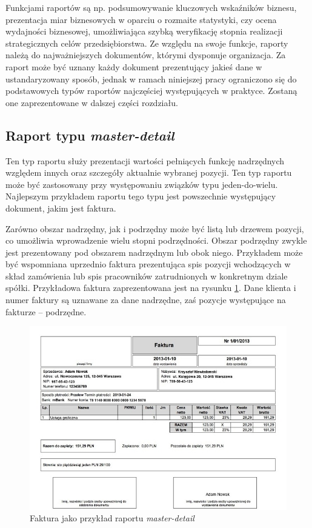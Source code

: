 \documentclass[11pt,a4paper]{article}
\begin{document}
Funkcjami raportów są np. podsumowywanie kluczowych wskaźników biznesu, prezentacja miar biznesowych w oparciu o rozmaite statystyki, czy ocena wydajności biznesowej, umożliwiająca szybką weryfikację stopnia realizacji strategicznych celów przedsiębiorstwa. Ze względu na swoje funkcje, raporty należą do najważniejszych dokumentów, którymi dysponuje organizacja. 
Za raport może być uznany każdy dokument prezentujący jakieś dane w ustandaryzowany sposób, jednak w ramach niniejszej pracy ograniczono się do podstawowych typów raportów najczęściej występujących w praktyce. Zostaną one zaprezentowane w dalszej części rozdziału.

\subsection{Raport typu \emph{master-detail}} \label{teoria:md}
Ten typ raportu służy prezentacji wartości pełniących funkcję nadrzędnych względem innych oraz szczegóły aktualnie wybranej pozycji. Ten typ raportu może być zastosowany przy występowaniu związków typu jeden-do-wielu. Najlepszym przykładem raportu tego typu jest powszechnie występujący dokument, jakim jest faktura. 

Zarówno obszar nadrzędny, jak i podrzędny może być listą lub drzewem pozycji, co umożliwia wprowadzenie wielu stopni podrzędności. Obszar podrzędny zwykle jest prezentowany pod obszarem nadrzędnym lub obok niego. Przykładem może być wspomniana uprzednio faktura prezentująca spis pozycji wchodzących w skład zamówienia lub spis pracowników zatrudnionych w konkretnym dziale spółki. Przykładowa faktura zaprezentowana jest na rysunku \ref{img:faktura}. Dane klienta i numer faktury są uznawane za dane nadrzędne, zaś pozycje występujące na fakturze -- podrzędne. 

\begin{figure}[h]
\centering
\includegraphics[scale=0.80]{faktura_vat_pdf}
\caption{Faktura jako przykład raportu \emph{master-detail}}
\label{img:faktura}
\end{figure}
\end{document}
